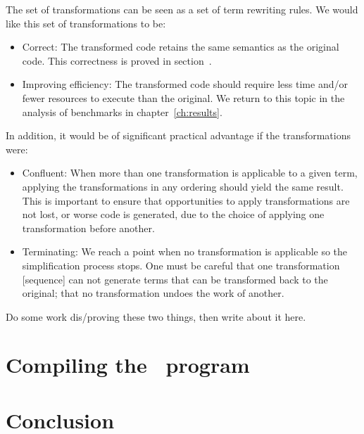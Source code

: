 The set of transformations can be seen as a set of term rewriting rules. We
would like this set of transformations to be:
%
\begin{itemize}
    \item Correct: The transformed code retains the same semantics as the
        original code. This correctness is proved in
        section~\derp.

    \item Improving efficiency: The transformed code should require less time
        and/or fewer resources to execute than the original. We return to this
        topic in the analysis of benchmarks in chapter~\ref{ch:results}.
\end{itemize}
%
In addition, it would be of significant practical advantage if the
transformations were:
%
\begin{itemize}
    \item Confluent: When more than one transformation is applicable to a given
        term, applying the transformations in any ordering should yield the same
        result. This is important to ensure that opportunities to apply
        transformations are not lost, or worse code is generated, due to
        the choice of applying one transformation before another.

    \item Terminating: We reach a point when no transformation is applicable so
        the simplification process stops. One must be careful that one
        transformation [sequence] can not generate terms that can be transformed
        back to the original; that no transformation undoes the work of another.
\end{itemize}

Do some work dis/proving these two things, then write about it here.


\section{Compiling the \derp\ program}

\section{Conclusion}

% 


